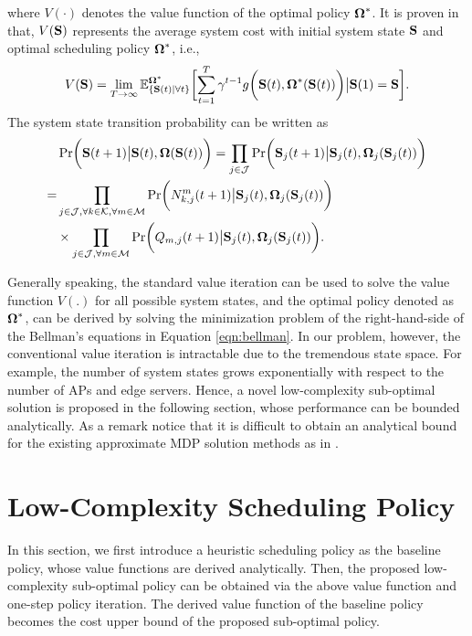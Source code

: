 where $V(\cdot)$ denotes the value function of the optimal policy $\boldsymbol{\Omega}^*$. It is proven in \cite{dp-control} that, $V(\mathbf{S})$ represents the average system cost with initial system state $\mathbf{S}$ and optimal scheduling policy $\boldsymbol{\Omega}^{*}$, i.e.,
\begin{eqnarray*}
    V(\Stat) = \lim\limits_{T\to\infty} \mathbb{E}_{\{\Stat(t)|\forall t\}}^{\Policy^{*}}
    \Bracket{
        \sum_{t=1}^{T} \gamma^{t-1}g\Paren{ \Stat(t),\Policy^{*}(\Stat(t)) }\big|\Stat(1)=\Stat
    }.
\end{eqnarray*}
The system state transition probability can be written as
\begin{align}\label{eqn:decouple}
    &\Pr\Paren{ \Stat(t+1)\big|\Stat(t),\Policy(\Stat(t)) }
    =\prod_{j\in\jSpace}\Pr\Paren{  \Stat_j(t+1)\big|\Stat_j(t),\Policy_j(\Stat_j(t))}
    \nonumber\\
    =&\prod_{j\in \jSpace,\forall k \in \apSet, \forall m \in \esSet}\Pr\Paren{ N_{k,j}^m(t+1)\big|\Stat_j(t),\Policy_j(\Stat_j(t)) }
    \nonumber\\
    &\times\prod_{j\in \jSpace,\forall m \in \esSet}\Pr\Paren{ Q_{m,j}(t+1)\big|\Stat_j(t),\Policy_j(\Stat_j(t)) }.
\end{align}

Generally speaking, the standard value iteration can be used to solve the value function $V(.)$ for all possible system states, and the optimal policy denoted as $\boldsymbol{\Omega}^{*}$, can be derived by solving the minimization problem of the right-hand-side of the  Bellman's equations in Equation \eqref{eqn:bellman}. In our problem, however, the conventional value iteration is intractable due to the tremendous state space. For example, the number of system states grows exponentially with respect to the number of APs and edge servers. Hence, a novel low-complexity sub-optimal solution is proposed in the following section, whose performance can be bounded analytically. As a remark notice that it is difficult to obtain an analytical bound for the existing approximate MDP solution methods as in \cite{Ruiwang2011,Cui2012,Ruiwang2013}.


\section{Low-Complexity Scheduling Policy}
\label{sec:chapter3_prev-solution}
In this section, we first introduce a heuristic scheduling policy as the baseline policy, whose value functions are derived analytically. Then, the proposed low-complexity sub-optimal policy can be obtained via the above value function and one-step policy iteration. The derived value function of the baseline policy becomes the cost upper bound of the proposed sub-optimal policy.

